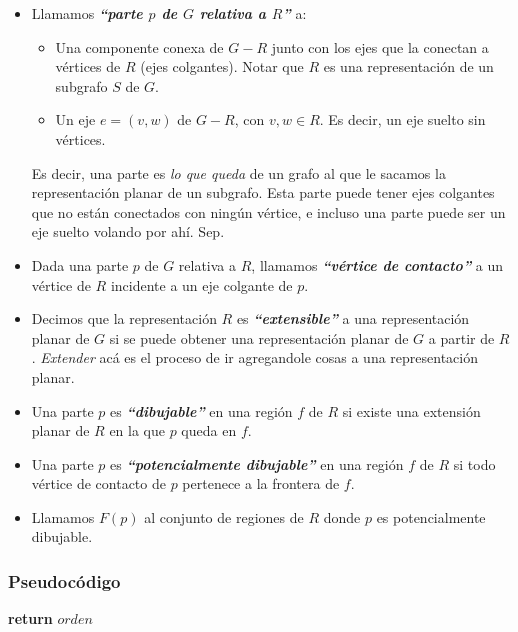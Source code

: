 \begin{itemize}
\item Llamamos \textbf{\emph{``parte $p$ de $G$ relativa a $R$''}} a:
    \begin{itemize}
    \item Una componente conexa de $G - R$ junto con los ejes que la conectan a v\'ertices de $R$ (ejes colgantes). Notar que $R$ es una representaci\'on de un subgrafo $S$ de $G$.
    \item Un eje $e = (v,w)$ de $G - R$, con $v,w \in R$. Es decir, un eje suelto sin v\'ertices. 
    \end{itemize}

    Es decir, una parte es \emph{lo que queda} de un grafo al que le sacamos la representaci\'on planar de un subgrafo. Esta parte puede tener ejes colgantes que no est\'an conectados con ning\'un v\'ertice, e incluso una parte puede ser un eje suelto volando por ah\'i. Sep.

\item Dada una parte $p$ de $G$ relativa a $R$, llamamos \textbf{\emph{``v\'ertice de contacto''}} a un v\'ertice de $R$ incidente a un eje colgante de $p$.
\item Decimos que la representaci\'on $R$ es \textbf{\emph{``extensible''}} a una representaci\'on planar de $G$ si se puede obtener una representaci\'on planar de $G$ a partir de $R$. \emph{Extender} ac\'a es el proceso de ir agregandole cosas a una representaci\'on planar.
\item Una parte $p$ es \textbf{\emph{``dibujable''}} en una regi\'on $f$ de $R$ si existe una extensi\'on planar de $R$ en la que $p$ queda en $f$.
\item Una parte $p$ es \textbf{\emph{``potencialmente dibujable''}} en una regi\'on $f$ de $R$ si todo v\'ertice de contacto de $p$ pertenece a la frontera de $f$.
\item Llamamos $F(p)$ al conjunto de regiones de $R$ donde $p$ es potencialmente dibujable.
\end{itemize}

\subsubsection{Pseudoc\'odigo}














\begin{algorithm}
\begin{algorithmic}[1]
  \State \textbf{return} $orden$
\EndFunction
\end{algorithmic}
\end{algorithm}